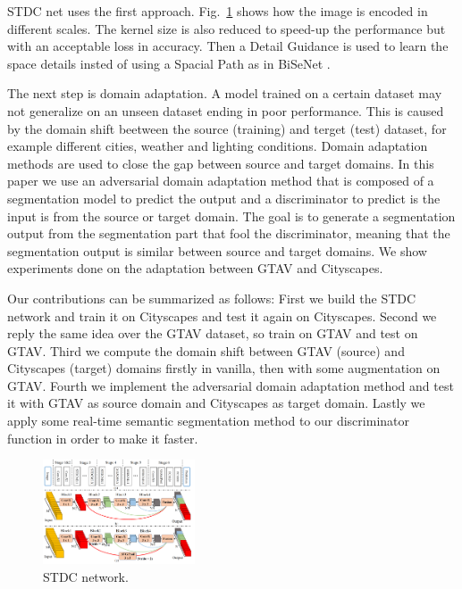 \documentclass[conference]{IEEEtran}
\begin{document}
STDC net \cite{b1} uses the first approach. Fig.~\ref{stdc_net} shows how the image is encoded in different scales. The kernel size is also reduced
to speed-up the performance but with an acceptable loss in accuracy. Then a Detail Guidance is used to learn the space details insted of 
using a Spacial Path as in BiSeNet \cite{b2}.

The next step is domain adaptation. A model trained on a certain dataset may not generalize on an unseen dataset ending in poor performance.
This is caused by the domain shift beetween the source (training) and terget (test) dataset, for example different cities, weather and 
lighting conditions. Domain adaptation methods are used to close the gap between source and target domains. In this paper we use an 
adversarial domain adaptation method \cite{b3} that is composed of a segmentation model to predict the output and a discriminator to
predict is the input is from the source or target domain. The goal is to generate a segmentation output from the segmentation part that 
fool the discriminator, meaning that the segmentation output is similar between source and target domains. We show experiments done on 
the adaptation between GTAV and Cityscapes.

Our contributions can be summarized as follows:
First we build the STDC network and train it on Cityscapes and test it again on Cityscapes. Second we reply the same idea over the 
GTAV dataset, so train on GTAV and test on GTAV. Third we compute the domain shift between GTAV (source) and Cityscapes (target) domains
firstly in vanilla, then with some augmentation on GTAV. Fourth we implement the adversarial domain adaptation method and test it 
with GTAV as source domain and Cityscapes as target domain. Lastly we apply some real-time semantic segmentation method to our 
discriminator function in order to make it faster. 


\begin{figure}[tp]
\centerline{\includegraphics[width=0.4\textwidth]{figures/Figure1-STDCnet.png}}
\caption{STDC network.}
\label{stdc_net}
\end{figure}
\end{document}

